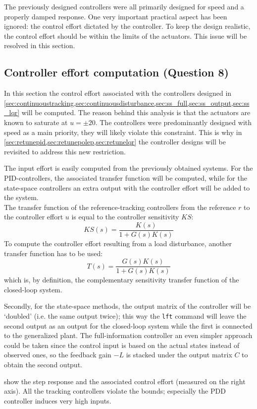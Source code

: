 The previously designed controllers were all primarily designed for speed and a properly damped response. One very important practical aspect has been ignored: the control effort dictated by the controller. To keep the design realistic, the control effort should be within the limits of the actuators. This issue will be resolved in this section.

\subsection{Controller effort computation \textnormal{\phantom{xxx}(Question 8)}}
In this section the control effort associated with the controllers designed in \cref{sec:continuoustracking,sec:continuousdisturbance,sec:ss_full,sec:ss_output,sec:ss_lqr} will be computed. The reason behind this analysis is that the actuators are known to saturate at $u = \pm20$. The controllers were predominantly designed with speed as a main priority, they will likely violate this constraint. This is why in \cref{sec:retunepid,sec:retunepolep,sec:retunelqr} the controller designs will be revisited to address this new restriction.

The input effort is easily computed from the previously obtained systems. For the PID-controllers, the associated transfer function will be computed, while for the state-space controllers an extra output with the controller effort will be added to the system.\\
\indent The transfer function of the reference-tracking controllers from the reference $r$ to the controller effort $u$ is equal to the controller sensitivity $KS$:
$$ KS(s) = \frac{K(s)}{1 + G(s)K(s)} $$
To compute the controller effort resulting from a load disturbance, another transfer function has to be used:
$$ T(s) = \frac{G(s)K(s)}{1 + G(s)K(s)}$$
which is, by definition, the complementary sensitivity transfer function of the closed-loop system. 

Secondly, for the state-space methods, the output matrix of the controller will be `doubled' (i.e. the same output twice); this way the \texttt{lft} command will leave the second output as an output for the closed-loop system while the first is connected to the generalized plant. The full-information controller an even simpler approach could be taken since the control input is based on the actual states instead of observed ones, so the feedback gain $-L$ is stacked under the output matrix $C$ to obtain the second output.

 show the step response and the associated control effort (measured on the right axis). All the tracking controllers violate the bounds; especially the PDD controller induces very high inputs. 

